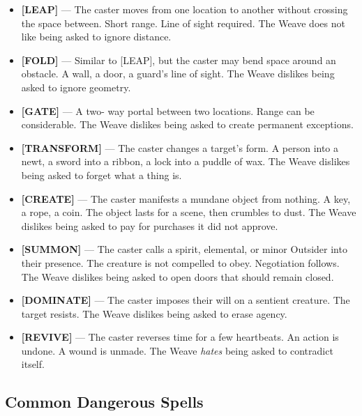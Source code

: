 \begin{itemize}
    \item \textbf{[LEAP]} --- The caster moves from one location to another without crossing the space between. Short range. Line of sight required. The Weave does not like being asked to ignore distance.
    \item \textbf{[FOLD]} --- Similar to [LEAP], but the caster may bend space around an obstacle. A wall, a door, a guard's line of sight. The Weave dislikes being asked to ignore geometry.
    \item \textbf{[GATE]} --- A two- way portal between two locations. Range can be considerable. The Weave dislikes being asked to create permanent exceptions.
    \item \textbf{[TRANSFORM]} --- The caster changes a target's form. A person into a newt, a sword into a ribbon, a lock into a puddle of wax. The Weave dislikes being asked to forget what a thing is.
    \item \textbf{[CREATE]} --- The caster manifests a mundane object from nothing. A key, a rope, a coin. The object lasts for a scene, then crumbles to dust. The Weave dislikes being asked to pay for purchases it did not approve.
    \item \textbf{[SUMMON]} --- The caster calls a spirit, elemental, or minor Outsider into their presence. The creature is not compelled to obey. Negotiation follows. The Weave dislikes being asked to open doors that should remain closed.
    \item \textbf{[DOMINATE]} --- The caster imposes their will on a sentient creature. The target resists. The Weave dislikes being asked to erase agency.
    \item \textbf{[REVIVE]} --- The caster reverses time for a few heartbeats. An action is undone. A wound is unmade. The Weave \emph{hates} being asked to contradict itself.
\end{itemize}

\subsection{Common Dangerous Spells}

